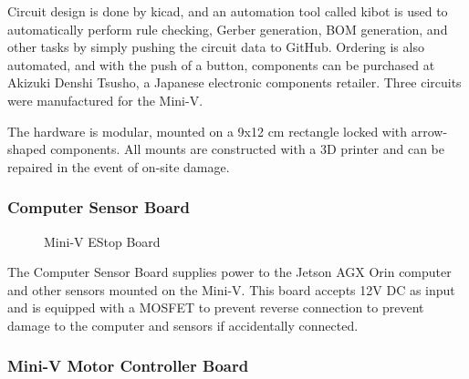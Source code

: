 \documentclass[lettersize,journal]{IEEEtran}
\begin{document}
Circuit design is done by kicad, and an automation tool called kibot is used to automatically perform rule checking, Gerber generation, BOM generation, and other tasks by simply pushing the circuit data to GitHub.
Ordering is also automated, and with the push of a button, components can be purchased at Akizuki Denshi Tsusho, a Japanese electronic components retailer.
Three circuits were manufactured for the Mini-V.

The hardware is modular, mounted on a 9x12 cm rectangle locked with arrow-shaped components.
All mounts are constructed with a 3D printer and can be repaired in the event of on-site damage.

\subsubsection{Computer Sensor Board}

\begin{figure}[H]
  \begin{center}
  \end{center}
  \caption{Mini-V EStop Board}
  \label{fig:miniv_computer_sensor_board}
\end{figure}

The Computer Sensor Board supplies power to the Jetson AGX Orin computer and other sensors mounted on the Mini-V.
This board accepts 12V DC as input and is equipped with a MOSFET to prevent reverse connection to prevent damage to the computer and sensors if accidentally connected.

\subsubsection{Mini-V Motor Controller Board}
\end{document}
